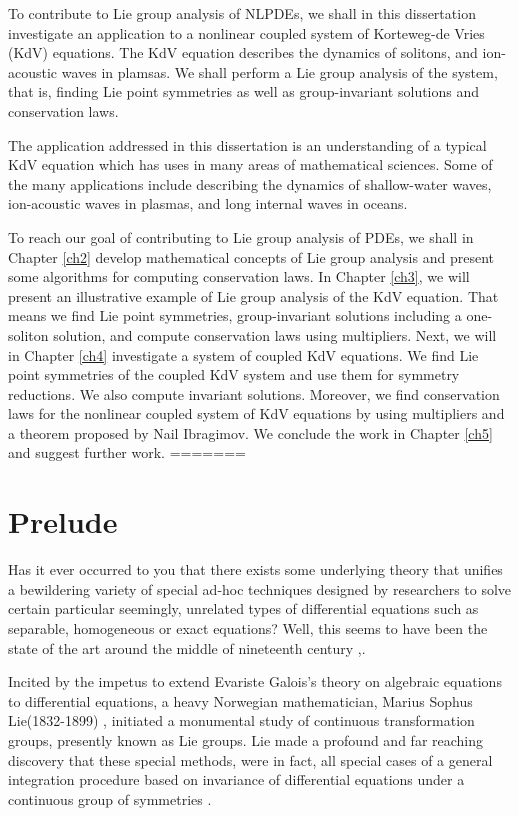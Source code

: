 To contribute to Lie group analysis of NLPDEs, we shall in this dissertation investigate an application to a  nonlinear coupled system of Korteweg-de Vries (KdV) equations. The KdV equation describes the dynamics of solitons, and ion-acoustic waves in plamsas. We shall perform a Lie group analysis of the system, that is, finding Lie point symmetries as well as group-invariant solutions and conservation laws.

The application addressed in this dissertation is an understanding of a typical KdV equation which has uses in many areas of mathematical sciences. Some of the many applications include describing the dynamics of shallow-water waves,  ion-acoustic waves in plasmas, and long internal waves in oceans.

To reach our goal of contributing to Lie group analysis of PDEs, we shall in Chapter \ref{ch2} develop mathematical concepts of Lie group analysis and present some algorithms for computing conservation laws. In Chapter \ref{ch3}, we will present an illustrative example of Lie group analysis of the KdV equation. That means we find Lie point symmetries, group-invariant solutions including a one-soliton solution, and compute conservation laws using multipliers. Next, we will in Chapter \ref{ch4} investigate a system of coupled KdV equations. We find Lie point symmetries of the coupled KdV system and use them for symmetry reductions. We also compute invariant solutions. Moreover, we find conservation laws for the nonlinear coupled system of  KdV equations by using multipliers and a theorem proposed by Nail Ibragimov. We conclude the work in Chapter \ref{ch5} and suggest further work.
=======
\chapter{Prelude}
Has it ever occurred to you that there exists some underlying theory that unifies a bewildering  variety of special ad-hoc techniques designed by researchers to solve certain particular seemingly, unrelated types of differential equations such as separable, homogeneous or exact equations? Well, this seems to have been  the state of the art around the middle of nineteenth century \citep{olver2000applications},\citep{arrigo2015symmetry}. 


Incited by the impetus to extend Evariste Galois's theory on algebraic equations to differential equations, a heavy Norwegian mathematician, Marius Sophus Lie(1832-1899) \citep{lie1891vorlesungen},\citep{fritzsche1999sophus}  initiated a monumental study of continuous transformation groups, presently known as Lie groups. Lie made a profound and far reaching discovery that these special methods, were in fact, all special cases of a general integration procedure based on invariance of differential equations under a continuous group of symmetries \citep{olver2000applications}.

